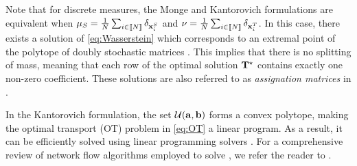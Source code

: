 Note that for discrete measures, the Monge and Kantorovich formulations are equivalent when $\mu_S = \frac{1}{N} \sum_{i \in {[\![N]\!]}} \delta_{{\mathbf{x}}^S_i}$ and $\nu = \frac{1}{N} \sum_{i \in {[\![N]\!]}} \delta_{{\mathbf{x}}^T_i}$. In this case, there exists a solution of \eqref{eq:Wasserstein} which corresponds to an extremal point of the polytope of doubly stochastic matrices \citep{bertsimas1997introduction}. This implies that there is no splitting of mass, meaning that each row of the optimal solution ${\mathbf{T}}^\star$ contains exactly one non-zero coefficient. These solutions are also referred to as \emph{assignation matrices} in .

In the Kantorovich formulation, the set ${\mathcal{U}}({\mathbf{a}}, {\mathbf{b}})$ forms a convex polytope, making the optimal transport (OT) problem in \eqref{eq:OT} a linear program. As a result, it can be efficiently solved using linear programming solvers \citep{dantzig2016linear}. For a comprehensive review of network flow algorithms employed to solve , we refer the reader to \citep{peyre2019computational}.

